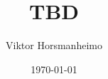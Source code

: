 \documentclass[english,twoside,censored,tkt]{HYthesisML}
\title{TBD}
\author{Viktor Horsmanheimo}
\date{\today}
\theoremstyle{definition}
\begin{document}
\maketitle




\mytableofcontents

\mainmatter






\printbibliography

\backmatter
\begin{appendices}


\end{appendices}
\end{document}
